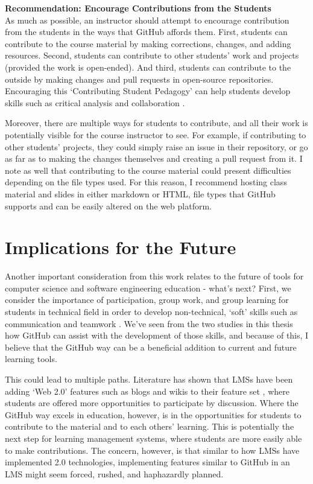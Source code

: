 \textbf{Recommendation: Encourage Contributions from the Students} \\
As much as possible, an instructor should attempt to encourage contribution from the students in the ways that GitHub affords them. First, students can contribute to the course material by making corrections, changes, and adding resources. Second, students can contribute to other students' work and projects (provided the work is open-ended). And third, students can contribute to the outside by making changes and pull requests in open-source repositories. Encouraging this `Contributing Student Pedagogy' can help students develop skills such as critical analysis and collaboration \cite{falkner2012supporting}.

Moreover, there are multiple ways for students to contribute, and all their work is potentially visible for the course instructor to see. For example, if contributing to other students' projects, they could simply raise an issue in their repository, or go as far as to making the changes themselves and creating a pull request from it. I note as well that contributing to the course material could present difficulties depending on the file types used. For this reason, I recommend hosting class material and slides in either markdown or HTML, file types that GitHub supports and can be easily altered on the web platform.

\section{Implications for the Future}
Another important consideration from this work relates to the future of tools for computer science and software engineering education - what's next? First, we consider the importance of participation, group work, and group learning for students in technical field in order to develop non-technical, `soft' skills such as communication and teamwork \cite{jazayeri2004education}. We've seen from the two studies in this thesis how GitHub can assist with the development of those skills, and because of this, I believe that the GitHub way can be a beneficial addition to current and future learning tools.

This could lead to multiple paths. Literature has shown that LMSs have been adding `Web 2.0' features such as blogs and wikis to their feature set \cite{downes2005feature}, where students are offered more opportunities to participate by discussion. Where the GitHub way excels in education, however, is in the opportunities for students to contribute to the material and to each others' learning. This is potentially the next step for learning management systems, where students are more easily able to make contributions. The concern, however, is that similar to how LMSs have implemented 2.0 technologies, implementing features similar to GitHub in an LMS might seem forced, rushed, and haphazardly planned.

